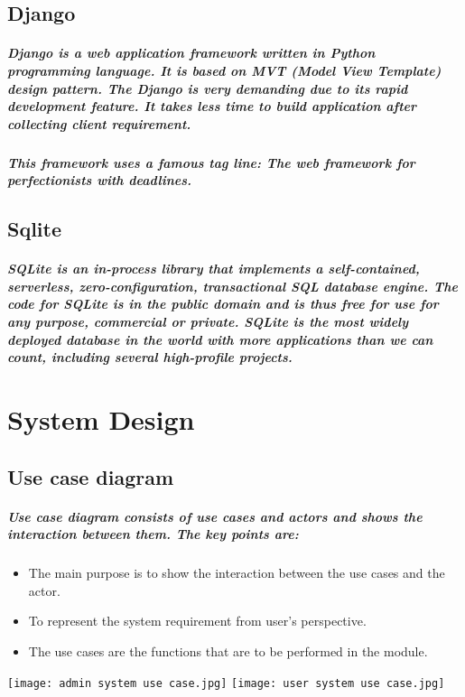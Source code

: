 \documentclass[12pt]{report}
\begin{document}
        \section{Django}
        \paragraph
        {
        Django is a web application framework written in Python programming language. It is based on MVT (Model View Template) design pattern. The Django is very demanding due to its rapid development feature. It takes less time to build application after collecting client requirement.
        }
        \paragraph
        {
        This framework uses a famous tag line: The web framework for perfectionists with deadlines.
        }
        \section{Sqlite}
        \paragraph
        {
        SQLite is an in-process library that implements a self-contained, serverless, zero-configuration, transactional SQL database engine. The code for SQLite is in the public domain and is thus free for use for any purpose, commercial or private. SQLite is the most widely deployed database in the world with more applications than we can count, including several high-profile projects.
        }
    \chapter{System Design}
        \section{Use case diagram}
        \paragraph
        {
        Use case diagram consists of use cases and actors and shows the interaction between them. The key points are: }
        \begin{itemize}
            \item The main purpose is to show the interaction between the use cases and the actor.
            \item To represent the system requirement from user’s perspective. 
            \item The use cases are the functions that are to be performed in the module. 
        \end{itemize}
        \begin{center}
            \texttt{[image: admin system use case.jpg]}
            \texttt{[image: user system use case.jpg]}
        \end{center}
\end{document}
